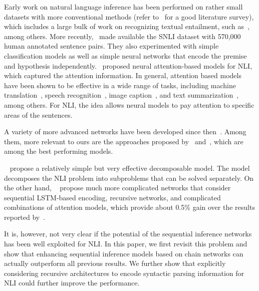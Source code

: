 \documentclass[11pt,a4paper]{article}
\begin{document}
Early work on natural language inference has been performed on rather small datasets with more conventional methods (refer to~\citet{MacCartneyThesis} for a good literature survey), which includes a large bulk of work on recognizing textual entailment, such as~\citep{Dagan2005ThePR,Iftene:W07-1421}, among others. 
More recently,~\citet{Bowman:D15-1075} made available the SNLI dataset with 570,000 human annotated sentence pairs. They also experimented with simple classification models as well as simple neural networks that encode the premise and hypothesis independently.~\citet{DBLP:journals/corr/RocktaschelGHKB15} proposed neural attention-based models for NLI, which captured the attention information. 
In general, attention based models have been shown to be effective in a wide range of tasks, including machine translation~\citep{DBLP:journals/corr/BahdanauCB14}, speech recognition~\citep{DBLP:conf/nips/ChorowskiBSCB15,DBLP:conf/icassp/ChanJLV16}, image caption~\citep{DBLP:conf/icml/XuBKCCSZB15}, and text summarization~\citep{Rush:D15-1044,DBLP:conf/ijcai/ChenZLWJ16}, among others. For NLI, the idea allows neural models to pay attention to specific areas of the sentences.

A variety of more advanced networks have been developed since then~\citep{Bowman:P16-1139,DBLP:journals/corr/VendrovKFU15,Mou:P16-2022,DBLP:journals/corr/LiuSLW16,DBLP:journals/corr/MunkhdalaiY16,DBLP:journals/corr/RocktaschelGHKB15,Wang:N16-1170,Cheng:D16-1053,Parikh:D16-1244,DBLP:journals/corr/MunkhdalaiY16b,Sha:C16-1270,DBLP:journals/corr/PariaADCP16}. Among them, more relevant to ours are the approaches proposed by~\citet{Parikh:D16-1244} and~\citet{DBLP:journals/corr/MunkhdalaiY16b}, which are among the best performing models.  

~\citet{Parikh:D16-1244} propose a relatively simple but very effective decomposable model. The model decomposes the NLI problem into subproblems that can be solved separately. On the other hand, ~\citet{DBLP:journals/corr/MunkhdalaiY16b} propose much more complicated networks that consider sequential LSTM-based encoding, recursive networks, and complicated combinations of attention models, which provide about 0.5\% gain over the results reported by~\citet{Parikh:D16-1244}.

It is, however, not very clear if the potential of the sequential inference networks has been well exploited for NLI. In this paper, we first revisit this problem and show that enhancing sequential inference models based on chain networks can actually outperform all previous results. We further show that explicitly considering recursive architectures to encode syntactic parsing information for NLI could further improve the performance. 
\end{document}
